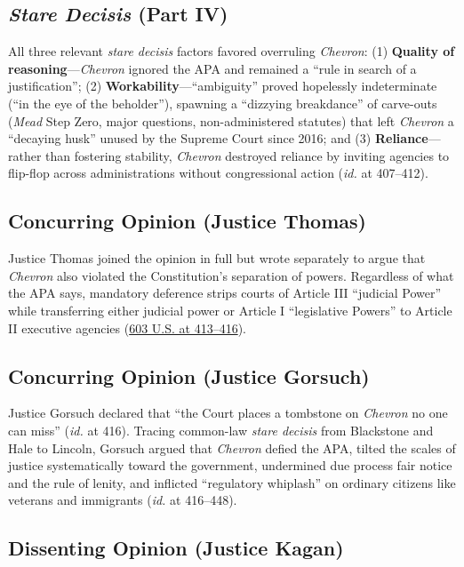 \documentclass[12pt]{article}
\begin{document}
\subsection{\textit{Stare Decisis} (Part IV)}

All three relevant \textit{stare decisis} factors favored overruling \textit{Chevron}: (1) \textbf{Quality of reasoning}---\textit{Chevron} ignored the APA and remained a ``rule in search of a justification''; (2) \textbf{Workability}---``ambiguity'' proved hopelessly indeterminate (``in the eye of the beholder''), spawning a ``dizzying breakdance'' of carve-outs (\textit{Mead} Step Zero, major questions, non-administered statutes) that left \textit{Chevron} a ``decaying husk'' unused by the Supreme Court since 2016; and (3) \textbf{Reliance}---rather than fostering stability, \textit{Chevron} destroyed reliance by inviting agencies to flip-flop across administrations without congressional action (\textit{id.} at 407--412).

\subsection{Concurring Opinion (Justice Thomas)}

Justice Thomas joined the opinion in full but wrote separately to argue that \textit{Chevron} also violated the Constitution's separation of powers. Regardless of what the APA says, mandatory deference strips courts of Article III ``judicial Power'' while transferring either judicial power or Article I ``legislative Powers'' to Article II executive agencies (\href{https://www.law.cornell.edu/supremecourt/text/22-451}{603 U.S. at 413--416}).

\subsection{Concurring Opinion (Justice Gorsuch)}

Justice Gorsuch declared that ``the Court places a tombstone on \textit{Chevron} no one can miss'' (\textit{id.} at 416). Tracing common-law \textit{stare decisis} from Blackstone and Hale to Lincoln, Gorsuch argued that \textit{Chevron} defied the APA, tilted the scales of justice systematically toward the government, undermined due process fair notice and the rule of lenity, and inflicted ``regulatory whiplash'' on ordinary citizens like veterans and immigrants (\textit{id.} at 416--448).

\subsection{Dissenting Opinion (Justice Kagan)}
\end{document}
